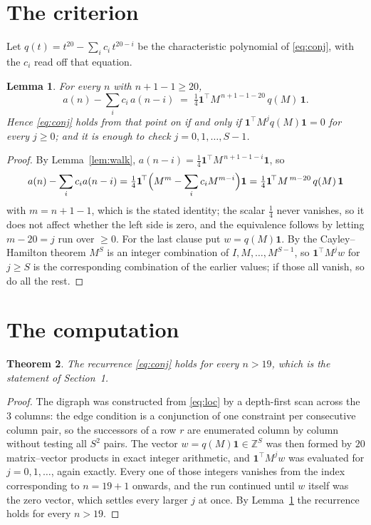\documentclass[11pt,a4paper]{article}
\theoremstyle{plain}
\newtheorem{theorem}{Theorem}
\newtheorem{lemma}[theorem]{Lemma}
\theoremstyle{definition}
\begin{document}
\section{The criterion}

Let $q(t)=t^{20}-\sum_i c_i\,t^{20-i}$ be the characteristic polynomial of
\eqref{eq:conj}, with the $c_i$ read off that equation.

\begin{lemma}\label{lem:crit}
For every $n$ with $n+1-1\ge20$,
\[
a(n)-\sum_i c_i\,a(n-i)\;=\;\tfrac1{4}\mathbf{1}^{\!\top}M^{\,n+1-1-20}\,q(M)\,\mathbf{1} .
\]
Hence \eqref{eq:conj} holds from that point on if and only if
$\mathbf{1}^{\!\top}M^{j}q(M)\mathbf{1}=0$ for every $j\ge0$; and it is enough to check
$j=0,1,\dots,S-1$.
\end{lemma}

\begin{proof}
By Lemma~\ref{lem:walk}, $a(n-i)=\tfrac1{4}\mathbf{1}^{\!\top}M^{\,n+1-1-i}\mathbf{1}$, so
\[
a(n)-\sum_i c_i a(n-i)
=\tfrac1{4}\mathbf{1}^{\!\top}\Bigl(M^{m}-\sum_i c_i M^{m-i}\Bigr)\mathbf{1}
=\tfrac1{4}\mathbf{1}^{\!\top}M^{\,m-20}\,q(M)\,\mathbf{1}
\]
with $m=n+1-1$, which is the stated identity; the scalar $\tfrac1{4}$ never vanishes, so it does not affect whether the left side is zero, and the equivalence follows by letting
$m-20=j$ run over $\ge0$. For the last clause put $w=q(M)\mathbf{1}$. By the
Cayley--Hamilton theorem $M^{S}$ is an integer combination of $I,M,\dots,M^{S-1}$, so
$\mathbf{1}^{\!\top}M^{j}w$ for $j\ge S$ is the corresponding combination of the earlier
values; if those all vanish, so do all the rest.
\end{proof}

\section{The computation}

\begin{theorem}
The recurrence \eqref{eq:conj} holds for every $n>19$, which is the statement of
Section~1.
\end{theorem}

\begin{proof}
The digraph was constructed from \eqref{eq:loc} by a depth-first scan across the $3$
columns: the edge condition is a conjunction of one constraint per consecutive column
pair, so the successors of a row $r$ are enumerated column by column without testing all
$S^2$ pairs. The vector $w=q(M)\mathbf{1}\in\mathbb{Z}^{S}$ was then formed by $20$
matrix--vector products in exact integer arithmetic, and $\mathbf{1}^{\!\top}M^{j}w$ was
evaluated for $j=0,1,\dots$, again exactly. Every one of those integers vanishes from the
index corresponding to $n=19+1$ onwards, and the run continued until $w$ itself was the
zero vector, which settles every larger $j$ at once. By Lemma~\ref{lem:crit} the recurrence
holds for every $n>19$.
\end{proof}
\end{document}
